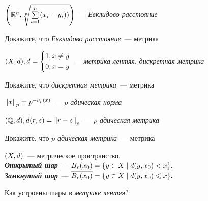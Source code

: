 \documentclass{article}
\begin{document}
    \begin{example}
        $\lr*{\R^n, \sqrt[p]{\sum\limits_{i=1}^{n}\lr*{x_i - y_i})}}$~--- \textit{Евклидово расстояние}
    \end{example}

    \begin{task_boxed}
        Докажите, что \textit{Евклидово расстояние}~--- метрика
    \end{task_boxed}

    \begin{example}
        $\lr*{X, d}, d =
        \begin{cases*}
            1, x \neq y \\
            0, x = y
        \end{cases*}$~---
        \textit{метрика лентяя}, \textit{дискретная метрика}
    \end{example}

    \begin{task_boxed}
        Докажите, что \textit{дискретная метрика}~--- метрика
    \end{task_boxed}

    \begin{definition_boxed}
        $\norm*{x}_p = p ^ {-\nu_p(x)}$~--- \textit{$p$-адическая норма}
    \end{definition_boxed}

    \begin{example}
        $\lr*{\Q, d}, d(r, s) = \norm*{r - s}_p$~---
        \textit{$p$-адическая метрика}
    \end{example}

    \begin{task_boxed}
        Докажите, что \textit{$p$-адическая метрика}~--- метрика
    \end{task_boxed}

    \begin{definition_boxed}
        $\lr*{X, d}$~--- метрическое пространство.\\
        \textbf{\textit{Открытый шар}}~--- $B_r(x_0) = \set*{y \in X \mid d(y, x_0) < x}.$\\
        \textbf{\textit{Замкнутый шар}}~--- $\overline{B_r(x_0)} = \set*{y \in X \mid d(y, x_0) \leqslant x}.$
    \end{definition_boxed}

    \begin{task_boxed}
        Как устроены шары в \textit{метрике лентяя}?
    \end{task_boxed}
\end{document}
